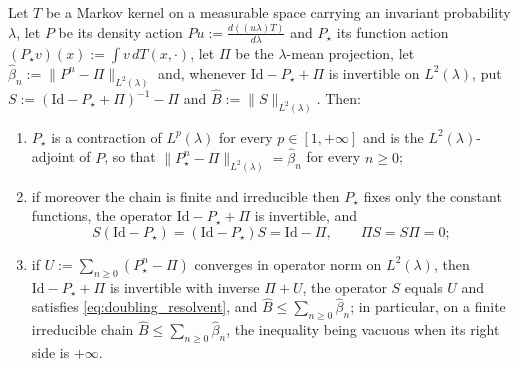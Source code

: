 \begin{lemma}\label{lem:doubling_operator}
Let $T$ be a Markov kernel on a measurable space carrying an invariant probability $\lambda$,
let $P$ be its density action $Pu:=\frac{d\left((u\lambda)T\right)}{d\lambda}$ and $P_\star$
its function action $(P_\star v)(x):=\int v\,dT(x,\cdot)$, let $\Pi$ be the $\lambda$-mean
projection, let $\widehat\beta_n:=\|P^n-\Pi\|_{L^2(\lambda)}$ and, whenever
$\mathrm{Id}-P_\star+\Pi$ is invertible on $L^2(\lambda)$, put
$S:=\left(\mathrm{Id}-P_\star+\Pi\right)^{-1}-\Pi$ and $\widehat B:=\|S\|_{L^2(\lambda)}$.
Then:
\begin{enumerate}
    \item $P_\star$ is a contraction of $L^p(\lambda)$ for every $p\in[1,+\infty]$ and is the
    $L^2(\lambda)$-adjoint of $P$, so that $\|P_\star^n-\Pi\|_{L^2(\lambda)}=\widehat\beta_n$
    for every $n\geq0$;
    \item if moreover the chain is finite and irreducible then $P_\star$ fixes only the
    constant functions, the operator $\mathrm{Id}-P_\star+\Pi$ is invertible, and
    \begin{equation}\label{eq:doubling_resolvent}
        S(\mathrm{Id}-P_\star)=(\mathrm{Id}-P_\star)S=\mathrm{Id}-\Pi,
        \qquad \Pi S=S\Pi=0 ;
    \end{equation}
    \item if $U:=\sum_{n\geq0}(P_\star^n-\Pi)$ converges in operator norm on $L^2(\lambda)$,
    then $\mathrm{Id}-P_\star+\Pi$ is invertible with inverse $\Pi+U$, the operator $S$ equals
    $U$ and satisfies \eqref{eq:doubling_resolvent}, and
    $\widehat B\leq\sum_{n\geq0}\widehat\beta_n$; in particular, on a finite irreducible chain
    $\widehat B\leq\sum_{n\geq0}\widehat\beta_n$, the inequality being vacuous when its right
    side is $+\infty$.
\end{enumerate}
\end{lemma}

